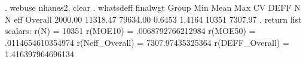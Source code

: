 . webuse nhanes2, clear
{\smallskip}
. whatsdeff finalwgt
{\smallskip}
    Group     {\VBAR}   Min     {\VBAR}   Mean    {\VBAR}   Max     {\VBAR}    CV   {\VBAR}   DEFF  {\VBAR}   N   {\VBAR}  N eff
      Overall {\VBAR}   2000.00 {\VBAR}  11318.47 {\VBAR}  79634.00 {\VBAR}  0.6453 {\VBAR}  1.4164 {\VBAR} 10351 {\VBAR} 7307.97
{\smallskip}
. return list
{\smallskip}
scalars:
                  r(N) =  10351
              r(MOE10) =  .0068792766212984
              r(MOE50) =  .0114654610354974
       r(Neff_Overall) =  7307.97435325364
       r(DEFF_Overall) =  1.416397964696134
{\smallskip}
